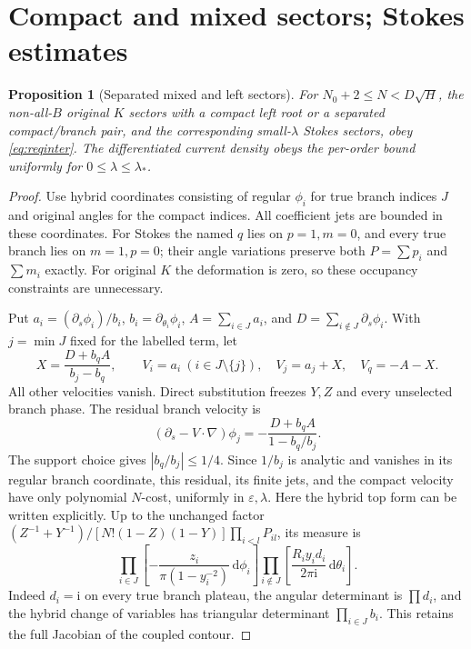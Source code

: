 \documentclass[11pt]{article}
\numberwithin{equation}{section}
\newtheorem{proposition}[theorem]{Proposition}
\theoremstyle{definition}
\newcommand{\dd}{\,\mathrm d}
\newcommand{\ii}{\mathrm i}
\newcommand{\eps}{\varepsilon}
\begin{document}
\section{Compact and mixed sectors; Stokes estimates}
\label{sec:sectors}
\begin{proposition}[Separated mixed and left sectors]\label{prop:mixed}
For \(N_0+2\le N<D\sqrt H\), the non-all-\(B\) original \(K\)
sectors with a compact left root or a separated compact/branch
pair, and the corresponding small-\(\lambda\) Stokes sectors,
obey \eqref{eq:reqinter}. The differentiated current density
obeys the per-order bound uniformly for \(0\le\lambda\le\lambda_*\).
\end{proposition}
\begin{proof}
Use hybrid coordinates consisting of regular \(\phi_i\) for true
branch indices \(J\) and original angles for the compact indices.
All coefficient jets are bounded in these coordinates.
For Stokes the named \(q\) lies on \(p=1,m=0\), and every true
branch lies on \(m=1,p=0\); their angle variations preserve both
\(P=\sum p_i\) and \(\sum m_i\) exactly.
For original \(K\) the deformation is zero, so these occupancy
constraints are unnecessary.

Put \(a_i=(\partial_s\phi_i)/b_i\),
\(b_i=\partial_{\theta_i}\phi_i\),
\(A=\sum_{i\in J}a_i\), and
\(D=\sum_{i\notin J}\partial_s\phi_i\).
With \(j=\min J\) fixed for the labelled term, let
\[
 X=\frac{D+b_qA}{b_j-b_q},\qquad
 V_i=a_i\ (i\in J\setminus\{j\}),\quad
 V_j=a_j+X,\quad V_q=-A-X .
 \]
All other velocities vanish. Direct substitution freezes \(Y,Z\)
and every unselected branch phase. The residual branch velocity is
\[
 (\partial_s-V\cdot\nabla)\phi_j
       =-\frac{D+b_qA}{1-b_q/b_j}.
\]
The support choice gives \(|b_q/b_j|\le1/4\).
Since \(1/b_j\) is analytic and vanishes in its regular branch
coordinate, this residual, its finite jets, and the compact
velocity have only polynomial \(N\)-cost, uniformly in \(\eps,\lambda\).
Here the hybrid top form can be written explicitly. Up to the
unchanged factor \((Z^{-1}+Y^{-1})/[N!(1-Z)(1-Y)]\prod_{i<l}P_{il}\),
its measure is
\[
 \prod_{i\in J}\left[-\frac{z_i}{\pi(1-y_i^{-2})}\dd\phi_i\right]
 \prod_{i\notin J}\left[\frac{R_i y_i d_i}{2\pi\ii}\dd\theta_i\right].
\]
Indeed \(d_i=\ii\) on every true branch plateau, the angular
determinant is \(\prod d_i\), and the hybrid change of variables
has triangular determinant \(\prod_{i\in J}b_i\).
This retains the full Jacobian of the coupled contour.


\end{proof}
\end{document}
